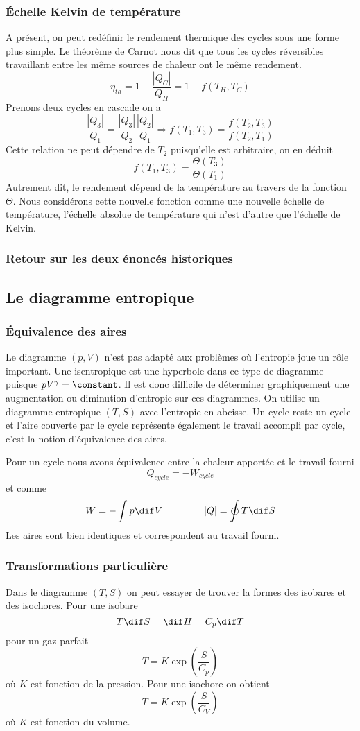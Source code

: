 \subsubsection{Échelle Kelvin de température}
A présent, on peut redéfinir le rendement thermique
des cycles sous une forme plus simple.
Le théorème de Carnot nous dit que tous les cycles réversibles travaillant
entre les même sources de chaleur ont le même rendement.
\[ \eta_{th} = 1-\frac{|Q_C|}{Q_H} = 1-f(T_H,T_C) \]
Prenons deux cycles en cascade on a
\[ \frac{|Q_3|}{Q_1} = \frac{|Q_3|}{Q_2}\frac{|Q_2|}{Q_1}
\Rightarrow f(T_1,T_3) = \frac{f(T_2,T_3)}{f(T_2,T_1)} \]
Cette relation ne peut dépendre de $T_2$ puisqu'elle est arbitraire,
on en déduit
\[ f(T_1,T_3) = \frac{\Theta (T_3)}{\Theta (T_1)} \]
Autrement dit, le rendement dépend de la température
au travers de la fonction $\Theta$.
Nous considérons cette nouvelle fonction comme une
nouvelle échelle de température, l'échelle absolue de température
qui n'est d'autre que l'échelle de Kelvin.

\subsubsection{Retour sur les deux énoncés historiques}

\subsection{Le diagramme entropique}
\subsubsection{Équivalence des aires}
Le diagramme $(p,V)$ n'est pas adapté aux problèmes
où l'entropie joue un rôle important.
Une isentropique est une hyperbole dans ce type
de diagramme puisque $pV^{\gamma} = \constant$.
Il est donc difficile de déterminer graphiquement une
augmentation ou diminution d'entropie sur ces diagrammes.
On utilise un diagramme entropique $(T,S)$ avec l'entropie en abcisse.
Un cycle reste un cycle et l'aire couverte par le cycle représente
également le travail accompli par cycle,
c'est la notion d'équivalence des aires.

Pour un cycle nous avons équivalence entre la chaleur
apportée et le travail fourni
\[ Q_{cycle} = -W_{cycle} \]
et comme
\[ W = -\int p\dif V \hspace{1.5cm} |Q| = \oint T\dif S \]
Les aires sont bien identiques et correspondent au travail fourni.

\subsubsection{Transformations particulière}
Dans le diagramme $(T,S)$ on peut essayer de trouver
la formes des isobares et des isochores.
Pour une isobare
\[ T\dif S = \dif H = C_p\dif T \]
pour un gaz parfait
\[ T = K \exp \left(\frac S{C_p}\right) \]
où $K$ est fonction de la pression.
Pour une isochore on obtient
\[ T = K \exp \left(\frac S{C_V}\right) \]
où $K$ est fonction du volume.

